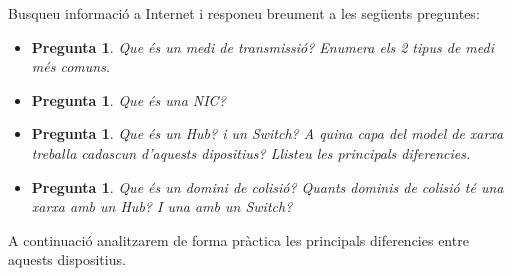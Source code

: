 \documentclass[12pt,a4paper]{article}
\newcounter{exercises}
\newtheorem{exer}[exercises]{Pregunta}
\begin{document}
Busqueu informació a Internet i responeu breument a les següents preguntes:

\begin{itemize}
\item \begin{exer}Que és un medi de transmissió? Enumera els 2 tipus de medi més comuns.\end{exer}
\item  \begin{exer} Que és una NIC?\end{exer}
\item \begin{exer}Que és un Hub? i un Switch? A quina capa del model de xarxa treballa cadascun d'aquests dipositius? Llisteu les principals diferencies.\end{exer}
\item \begin{exer}Que és un domini de colisió? Quants dominis de colisió té una xarxa amb un Hub? I una amb un Switch?\end{exer}
\end{itemize}

A continuació analitzarem de forma pràctica les principals diferencies entre aquests dispositius.
\end{document}
